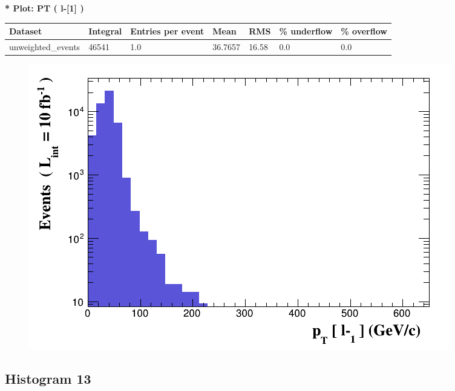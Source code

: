 \documentclass[a4paper, 10pt]{article}
\begin{document}
\textbf{* Plot: PT ( l-[1] ) }\\
   \begin{table}[H]
  \begin{center}
    \begin{tabular}{|m{23.0mm}|m{23.0mm}|m{18.0mm}|m{19.0mm}|m{19.0mm}|m{19.0mm}|m{19.0mm}|}
      \hline
      {\cellcolor{yellow}         Dataset}& {\cellcolor{yellow}         Integral}& {\cellcolor{yellow}         Entries per event}& {\cellcolor{yellow}         Mean}& {\cellcolor{yellow}         RMS}& {\cellcolor{yellow}         \% underflow}& {\cellcolor{yellow}         \% overflow}\\
      \hline
      {\cellcolor{white}         unweighted\_events}& {\cellcolor{white}         46541}& {\cellcolor{white}         1.0}& {\cellcolor{white}         36.7657}& {\cellcolor{white}         16.58}& {\cellcolor{green}         0.0}& {\cellcolor{green}         0.0}\\
\hline
    \end{tabular}
  \end{center}
\end{table}

\begin{figure}[H]
  \begin{center}
    \includegraphics[scale=0.45]{selection_11.png}\\
\caption{   }
  \end{center}
\end{figure}
      \newpage
\subsection{ Histogram 13}
\end{document}

